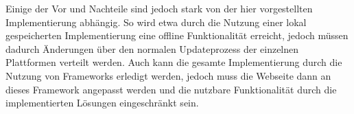Einige der Vor und Nachteile sind jedoch stark von der hier vorgestellten Implementierung abhängig. So wird etwa durch die Nutzung einer lokal gespeicherten Implementierung eine offline Funktionalität erreicht, jedoch müssen dadurch Änderungen über den normalen Updateprozess der einzelnen Plattformen verteilt werden.
Auch kann die gesamte Implementierung durch die Nutzung von Frameworks erledigt werden, jedoch muss die Webseite dann an dieses Framework angepasst werden und die nutzbare Funktionalität durch die implementierten Lösungen eingeschränkt sein. 
